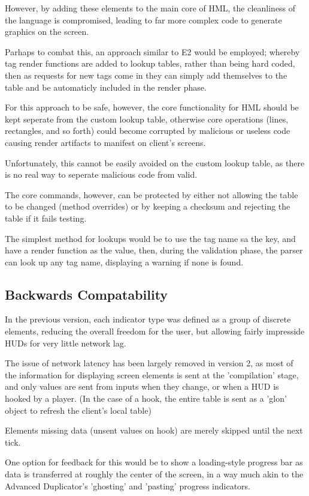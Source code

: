 \documentclass[10pt,a4paper]{article}
\begin{document}
However, by adding these elements to the main core of HML, the cleanliness of the language is compromised, leading to far more complex code to generate graphics on the screen.

Parhaps to combat this, an approach similar to E2 would be employed; whereby tag render functions are added to lookup tables, rather than being hard coded, then as requests for new tags come in they can simply add themselves to the table and be automaticly included in the render phase.

For this approach to be safe, however, the core functionality for HML should be kept seperate from the custom lookup table, otherwise core operations (lines, rectangles, and so forth) could become corrupted by malicious or useless code causing render artifacts to manifest on client's screens.

Unfortunately, this cannot be easily avoided on the custom lookup table, as there is no real way to seperate malicious code from valid.

The core commands, however, can be protected by either not allowing the table to be changed (method overrides) or by keeping a checksum and rejecting the table if it fails testing.

The simplest method for lookups would be to use the tag name sa the key, and have a render function as the value, then, during the validation phase, the parser can look up any tag name, displaying a warning if none is found.

\subsection{Backwards Compatability}

In the previous version, each indicator type was defined as a group of discrete elements, reducing the overall freedom for the user, but allowing fairly impresside HUDs for very little network lag.

The issue of network latency has been largely removed in version 2, as most of the information for displaying screen elements is sent at the 'compilation' stage, and only values are sent from inputs when they change, or when a HUD is hooked by a player.  (In the case of a hook, the entire table is sent as a 'glon' object to refresh the client's local table)

Elements missing data (unsent values on hook) are merely skipped until the next tick.

One option for feedback for this would be to show a loading-style progress bar as data is transferred at roughly the center of the screen, in a way much akin to the Advanced Duplicator's 'ghosting' and 'pasting' progress indicators.
\end{document}
